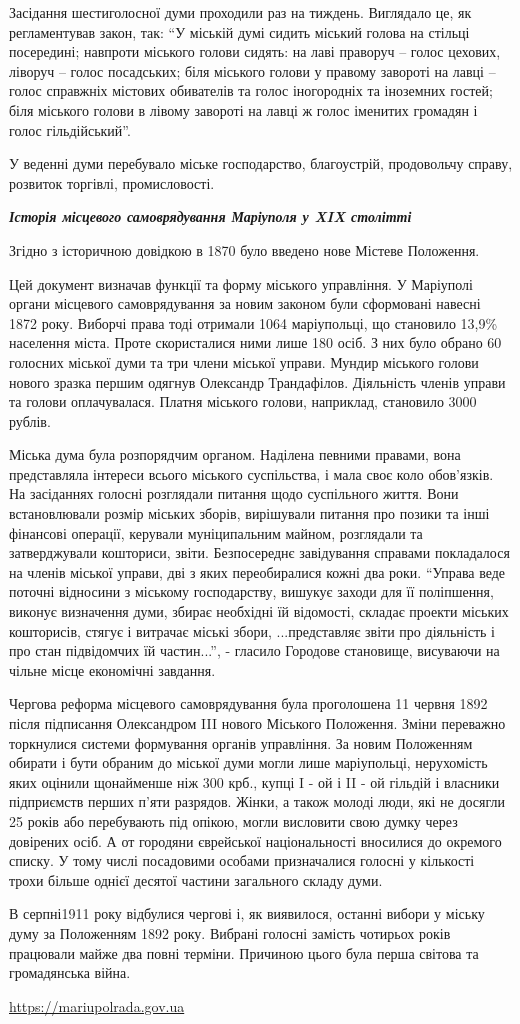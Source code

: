 Засідання шестиголосної думи проходили раз на тиждень. Виглядало це, як
регламентував закон, так: \enquote{У міській думі сидить міський голова на стільці
посередині; навпроти міського голови сидять: на лаві праворуч – голос цехових,
ліворуч – голос посадських; біля міського голови у правому завороті на лавці –
голос справжніх містових обивателів та голос іногородніх та іноземних гостей;
біля міського голови в лівому завороті на лавці ж голос іменитих громадян і
голос гільдійський}.

У веденні думи перебувало міське господарство, благоустрій, продовольчу справу,
розвиток торгівлі, промисловості.

\textbf{\emph{Історія місцевого самоврядування Маріуполя у XIX столітті}}

Згідно з історичною довідкою в 1870 було введено нове Містеве Положення.

Цей документ визначав функції та форму міського управління. У Маріуполі органи
місцевого самоврядування за новим законом були сформовані навесні 1872 року.
Виборчі права тоді отримали 1064 маріупольці, що становило 13,9\% населення
міста. Проте скористалися ними лише 180 осіб. З них було обрано 60 голосних
міської думи та три члени міської управи. Мундир міського голови нового зразка
першим одягнув Олександр Трандафілов. Діяльність членів управи та голови
оплачувалася. Платня міського голови, наприклад, становило 3000 рублів.

Міська дума була розпорядчим органом. Наділена певними правами, вона
представляла інтереси всього міського суспільства, і мала своє коло обов'язків.
На засіданнях голосні розглядали питання щодо суспільного життя. Вони
встановлювали розмір міських зборів, вирішували питання про позики та інші
фінансові операції, керували муніципальним майном, розглядали та затверджували
кошториси, звіти. Безпосереднє завідування справами покладалося на членів
міської управи, дві з яких переобиралися кожні два роки. \enquote{Управа веде поточні
відносини з міському господарству, вишукує заходи для її поліпшення, виконує
визначення думи, збирає необхідні їй відомості, складає проекти міських
кошторисів, стягує і витрачає міські збори, ...представляє звіти про діяльність і
про стан підвідомчих їй частин...}, - гласило Городове становище, висуваючи на
чільне місце економічні завдання.

Чергова реформа місцевого самоврядування була проголошена 11 червня 1892 після
підписання Олександром III нового Міського Положення. Зміни переважно
торкнулися системи формування органів управління. За новим Положенням обирати і
бути обраним до міської думи могли лише маріупольці, нерухомість яких оцінили
щонайменше ніж 300 крб., купці I - ой і II - ой гільдій і власники підприємств
перших п'яти разрядов. Жінки, а також молоді люди, які не досягли 25 років або
перебувають під опікою, могли висловити свою думку через довірених осіб. А от
городяни єврейської національності вносилися до окремого списку. У тому числі
посадовими особами призначалися голосні у кількості трохи більше однієї десятої
частини загального складу думи.

В серпні1911 року відбулися чергові і, як виявилося, останні вибори у міську
думу за Положенням 1892 року. Вибрані голосні замість чотирьох років працювали
майже два повні терміни. Причиною цього була перша світова та громадянська
війна.

\url{https://mariupolrada.gov.ua}
